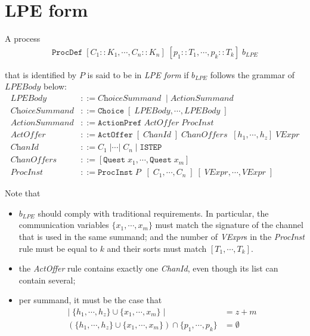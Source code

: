 \section{LPE form} \label{sec:lpeform}

A \txs{} process
\begin{align*}
\texttt{ProcDef} \; [C_1 :: K_1, \cdots{}, C_n :: K_n] \; [p_1 :: T_1, \cdots{}, p_k :: T_k] \; b_\textit{LPE}
\end{align*}

that is identified by $P$ is said to be in \emph{LPE form} if $b_\textit{LPE}$ follows the grammar of $\textit{LPEBody}$ below:
\begin{align*}
\textit{LPEBody} &::= \textit{ChoiceSummand} \; \;|\; \textit{ActionSummand} \\
\textit{ChoiceSummand} &::= \texttt{Choice} \; [ \;\! \textit{LPEBody}, \cdots{}, \textit{LPEBody} \; ] \\
\textit{ActionSummand} &::= \texttt{ActionPref} \; \textit{ActOffer} \; \textit{ProcInst} \\
\textit{ActOffer} &::= \texttt{ActOffer} \; [ \;\! \textit{ChanId} \; ] \; \textit{ChanOffers}\; \; [h_1, \cdots{}, h_z] \; \textit{VExpr} \\
\textit{ChanId} &::= C_1 \;| \cdots{} |\; C_n \;|\; \texttt{ISTEP} \\
\textit{ChanOffers} &::= [\texttt{Quest} \; x_1, \cdots{}, \texttt{Quest} \; x_m] \\
\textit{ProcInst} &::= \texttt{ProcInst} \; P \; \; [ \;\! C_1, \cdots{}, C_n \; ] \; [\;\!\textit{VExpr}, \cdots{}, \textit{VExpr} \; ]
\end{align*}

Note that
\begin{itemize}
\item $b_\textit{LPE}$ should comply with traditional \txs{} requirements.
In particular, the communication variables $\{ x_1, \cdots{}, x_m \}$ must match the signature of the channel that is used in the same summand; and the number of \textit{VExpr}s in the \textit{ProcInst} rule must be equal to $k$ and their sorts must match $[T_1, \cdots{}, T_k]$.
\item the \textit{ActOffer} rule contains exactly one \textit{ChanId}, even though its list can contain several;
\item per summand, it must be the case that
\begin{align*}
|\; \{ h_1, \cdots{}, h_z \} \cup \{ x_1, \cdots{}, x_m \} \; | &= z + m \\
(\{ h_1, \cdots{}, h_z \} \cup \{ x_1, \cdots{}, x_m \}) \cap \{ p_1, \cdots{}, p_k \} &= \emptyset{}
\end{align*}
\end{itemize}


